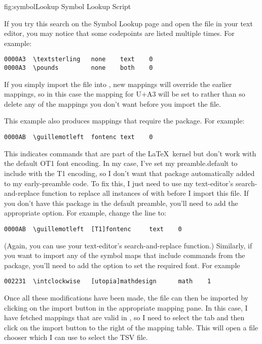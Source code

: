 \FloatFig
  {fig:symbolLookup}
  {}
  {Symbol Lookup Script}

If you try this search on the Symbol Lookup page and open the file in your
 text editor, you may notice that some codepoints are listed
multiple times. For example:
\begin{verbatim}
0000A3  \textsterling   none    text    0
0000A3  \pounds         none    both    0
\end{verbatim}
If you simply import the file into \FlowframTk, new mappings will
override the earlier mappings, so in this case the mapping for
U+A3 will be set to  rather than
 so delete any of the mappings you don't want
before you import the file.

This example also produces mappings that require the 
package. For example:
\begin{verbatim}
0000AB  \guillemotleft  fontenc text    0
\end{verbatim}
This indicates commands that are part of the \LaTeX\ kernel but don't
work with the default OT1 font encoding. In my case, I've set my
\gls{preamble.default} to include
 with the T1 encoding, so I don't want that package
automatically added to my early-preamble code. To fix this, I just need to
use my text-editor's search-and-replace function to replace all instances of
 with  before I import this file. If you don't
have this package in the default preamble, you'll need to add the appropriate
option.  For example, change the line to:
\begin{verbatim}
0000AB  \guillemotleft  [T1]fontenc     text    0
\end{verbatim}
(Again, you can use your text-editor's search-and-replace function.)
Similarly, if you want to import any of the symbol maps that include
commands from the  package, you'll need to add
the option to set the required font. For example
\begin{verbatim}
002231  \intclockwise   [utopia]mathdesign      math    1
\end{verbatim}

Once all these modifications have been made, the file can then be
imported by clicking on the import button in the appropriate mapping
pane. In this case, I have fetched mappings that are valid in
\textmode, so I need to select the  tab
and then click on the import button to the right of the mapping
table. This will open a file chooser which I can use to select the
TSV file.


